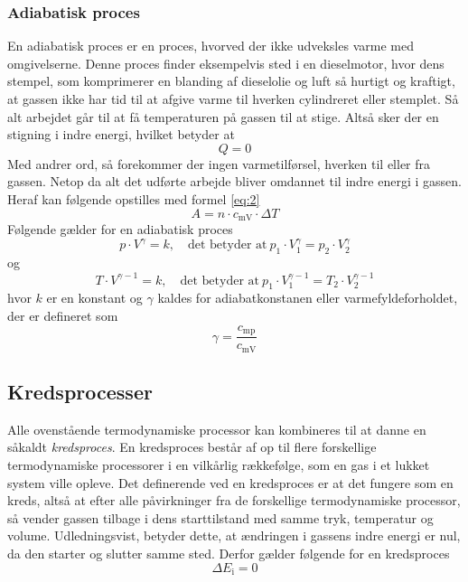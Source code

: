 \documentclass[SRC.tex]{subfiles}
\begin{document}
	\subsubsection{Adiabatisk proces}
	En adiabatisk proces er en proces, hvorved der ikke udveksles varme med 
	omgivelserne. Denne proces finder eksempelvis sted i en dieselmotor, hvor dens 
	stempel, som komprimerer en blanding af dieselolie og luft så hurtigt og kraftigt,
	at gassen ikke har tid til at afgive varme til hverken cylindreret eller stemplet. Så alt arbejdet går til at få temperaturen på gassen til at stige. Altså sker der en stigning i indre energi, hvilket betyder at 
	\begin{equation}
	Q = 0
	\end{equation}
	Med andrer ord, så forekommer der ingen varmetilførsel, hverken til eller fra gassen. Netop da 
	alt det udførte arbejde bliver omdannet til indre energi i gassen. Heraf kan
	følgende opstilles med formel \eqref{eq:2}
	\begin{equation}
	A = n \cdot c_{\text{mV}} \cdot \Delta T 
	\end{equation}
	Følgende gælder for en adiabatisk proces
	\begin{equation}
	p \cdot V^\gamma = k,\quad \text{det betyder at}\ p_1 \cdot V_1^\gamma= p_2 \cdot V_2^\gamma
	\end{equation}
	og 
	\begin{equation}
	T \cdot V^{\gamma-1} = k,\quad \text{det betyder at}\ p_1 \cdot V_1^{\gamma-1}= T_2 \cdot V_2^{\gamma-1}
	\end{equation}
	hvor \(k\) er en konstant og \(\gamma\) kaldes
	for adiabatkonstanen eller varmefyldeforholdet, der er defineret som
	\begin{equation}
	\gamma = \frac{c_{\textrm{mp}}}{c_{\textrm{mV}}}
	\end{equation}
	\subsection{Kredsprocesser}
	Alle ovenstående termodynamiske processor kan kombineres til at danne
	en såkaldt \textit{kredsproces}. En kredsproces består af op til flere 
	forskellige termodynamiske processorer i en vilkårlig rækkefølge, som en gas i 
	et lukket system ville opleve. Det definerende ved en kredsproces er at det fungere som en kreds, altså at efter alle påvirkninger
	fra de forskellige termodynamiske processor, så vender gassen tilbage i dens starttilstand med
	samme tryk, temperatur og volume. Udledningsvist, betyder dette, at ændringen 
	i gassens indre energi er nul, da den starter og slutter samme sted. Derfor gælder følgende for en kredsproces
	\begin{equation}
	\Delta E_\text{i} = 0
	\end{equation} 
\end{document}
